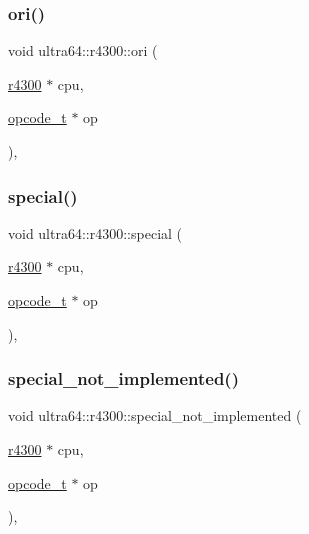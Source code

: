 \mbox{\label{classultra64_1_1r4300_a170dd0a135bf08858d2f1c26fe5e9404}} 
\subsubsection{\texorpdfstring{ori()}{ori()}}
{\footnotesize\ttfamily void ultra64\+::r4300\+::ori (\begin{DoxyParamCaption}\item[{\hyperlink{classultra64_1_1r4300}{r4300} $\ast$}]{cpu,  }\item[{\hyperlink{classultra64_1_1opcode__t}{opcode\+\_\+t} $\ast$}]{op }\end{DoxyParamCaption})\hspace{0.3cm}{\ttfamily [static]}, {\ttfamily [private]}}

\mbox{\label{classultra64_1_1r4300_aeb7775275197e58bc21e3b801567120e}} 
\subsubsection{\texorpdfstring{special()}{special()}}
{\footnotesize\ttfamily void ultra64\+::r4300\+::special (\begin{DoxyParamCaption}\item[{\hyperlink{classultra64_1_1r4300}{r4300} $\ast$}]{cpu,  }\item[{\hyperlink{classultra64_1_1opcode__t}{opcode\+\_\+t} $\ast$}]{op }\end{DoxyParamCaption})\hspace{0.3cm}{\ttfamily [static]}, {\ttfamily [private]}}

\mbox{\label{classultra64_1_1r4300_aa897d0fe9ea4fa3da5ad238fc53c1437}} 
\subsubsection{\texorpdfstring{special\+\_\+not\+\_\+implemented()}{special\_not\_implemented()}}
{\footnotesize\ttfamily void ultra64\+::r4300\+::special\+\_\+not\+\_\+implemented (\begin{DoxyParamCaption}\item[{\hyperlink{classultra64_1_1r4300}{r4300} $\ast$}]{cpu,  }\item[{\hyperlink{classultra64_1_1opcode__t}{opcode\+\_\+t} $\ast$}]{op }\end{DoxyParamCaption})\hspace{0.3cm}{\ttfamily [static]}, {\ttfamily [private]}}

